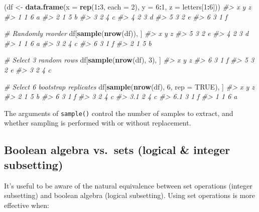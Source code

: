 \documentclass[]{book}
\newenvironment{Shaded}{\begin{snugshade}}{\end{snugshade}}
\newcommand{\CommentTok}[1]{\textcolor[rgb]{0.56,0.35,0.01}{\textit{#1}}}
\newcommand{\DataTypeTok}[1]{\textcolor[rgb]{0.13,0.29,0.53}{#1}}
\newcommand{\DecValTok}[1]{\textcolor[rgb]{0.00,0.00,0.81}{#1}}
\newcommand{\KeywordTok}[1]{\textcolor[rgb]{0.13,0.29,0.53}{\textbf{#1}}}
\newcommand{\NormalTok}[1]{#1}
\newcommand{\OperatorTok}[1]{\textcolor[rgb]{0.81,0.36,0.00}{\textbf{#1}}}
\newcommand{\OtherTok}[1]{\textcolor[rgb]{0.56,0.35,0.01}{#1}}
\newcommand{\StringTok}[1]{\textcolor[rgb]{0.31,0.60,0.02}{#1}}
\theoremstyle{definition}
\theoremstyle{definition}
\theoremstyle{definition}
\theoremstyle{remark}
\begin{document}
\begin{Shaded}
\begin{Highlighting}[]
\NormalTok{(df <-}\StringTok{ }\KeywordTok{data.frame}\NormalTok{(}\DataTypeTok{x =} \KeywordTok{rep}\NormalTok{(}\DecValTok{1}\OperatorTok{:}\DecValTok{3}\NormalTok{, }\DataTypeTok{each =} \DecValTok{2}\NormalTok{), }\DataTypeTok{y =} \DecValTok{6}\OperatorTok{:}\DecValTok{1}\NormalTok{, }\DataTypeTok{z =}\NormalTok{ letters[}\DecValTok{1}\OperatorTok{:}\DecValTok{6}\NormalTok{]))}
\CommentTok{#>   x y z}
\CommentTok{#> 1 1 6 a}
\CommentTok{#> 2 1 5 b}
\CommentTok{#> 3 2 4 c}
\CommentTok{#> 4 2 3 d}
\CommentTok{#> 5 3 2 e}
\CommentTok{#> 6 3 1 f}

\CommentTok{# Randomly reorder}
\NormalTok{df[}\KeywordTok{sample}\NormalTok{(}\KeywordTok{nrow}\NormalTok{(df)), ]}
\CommentTok{#>   x y z}
\CommentTok{#> 5 3 2 e}
\CommentTok{#> 4 2 3 d}
\CommentTok{#> 1 1 6 a}
\CommentTok{#> 3 2 4 c}
\CommentTok{#> 6 3 1 f}
\CommentTok{#> 2 1 5 b}

\CommentTok{# Select 3 random rows}
\NormalTok{df[}\KeywordTok{sample}\NormalTok{(}\KeywordTok{nrow}\NormalTok{(df), }\DecValTok{3}\NormalTok{), ]}
\CommentTok{#>   x y z}
\CommentTok{#> 6 3 1 f}
\CommentTok{#> 5 3 2 e}
\CommentTok{#> 3 2 4 c}

\CommentTok{# Select 6 bootstrap replicates}
\NormalTok{df[}\KeywordTok{sample}\NormalTok{(}\KeywordTok{nrow}\NormalTok{(df), }\DecValTok{6}\NormalTok{, }\DataTypeTok{rep =} \OtherTok{TRUE}\NormalTok{), ]}
\CommentTok{#>     x y z}
\CommentTok{#> 2   1 5 b}
\CommentTok{#> 6   3 1 f}
\CommentTok{#> 3   2 4 c}
\CommentTok{#> 3.1 2 4 c}
\CommentTok{#> 6.1 3 1 f}
\CommentTok{#> 1   1 6 a}
\end{Highlighting}
\end{Shaded}

The arguments of \texttt{sample()} control the number of samples to
extract, and whether sampling is performed with or without replacement.

\hypertarget{boolean-algebra-vs.sets-logical-integer-subsetting}{%
\subsection{Boolean algebra vs.~sets (logical \& integer
subsetting)}\label{boolean-algebra-vs.sets-logical-integer-subsetting}}

It's useful to be aware of the natural equivalence between set
operations (integer subsetting) and boolean algebra (logical
subsetting). Using set operations is more effective when:
\end{document}
